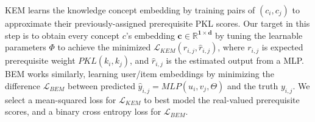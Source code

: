 KEM learns the knowledge concept embedding by training pairs of $(c_i,c_j)$ to approximate their previously-assigned prerequisite PKL scores. 
Our target in this step is to obtain every concept $c$'s embedding $\mathbf{c} \in \mathbf{\mathbb{R}^{1 \times d}}$ by tuning the learnable parameters $\Phi$
to achieve the minimized $\mathcal{L}_{KEM}(r_{i,j}, \hat{r}_{i,j})$, where $r_{i,j}$ is expected prerequisite weight $PKL(k_i,k_j)$, and $\hat{r}_{i,j}$ is the estimated output from a 
MLP.
BEM works similarly, learning user/item embeddings by minimizing the difference $\mathcal{L}_{BEM}$ between predicted 
$\hat{y}_{i,j} = MLP(u_i, v_j, \Theta)$ 
and the truth $y_{i,j}$. 
We select a mean-squared loss for $\mathcal{L}_{KEM}$
to best model the real-valued prerequisite scores, and a binary cross entropy loss for $\mathcal{L}_{BEM}$.

